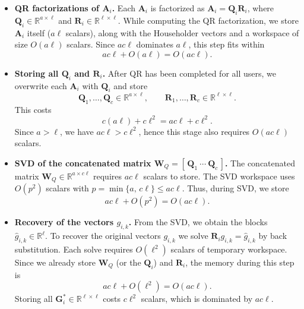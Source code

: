 \documentclass[final,3p,times]{elsarticle}
\theoremstyle{plain}
\newcommand{\matr}[1]{\bm{#1}}        %
\begin{document}
\begin{itemize}

  \item \textbf{QR factorizations of $\matr{A}_{i}$.}
        Each $\matr{A}_{i}$ is factorized as $\matr{A}_{i} = \matr{Q}_{i}\matr{R}_{i}$, where $\matr{Q}_{i}\in\mathbb{R}^{a\times \ell}$ and $\matr{R}_{i}\in\mathbb{R}^{\ell\times \ell}$. While computing the QR factorization, we store $\matr{A}_{i}$ itself ($a\ell$ scalars), along with the Householder vectors and a workspace of size $O(a\ell)$ scalars. Since $a c \ell$ dominates $a\ell$, this step fits within
        \begin{equation}
          a c \ell + O(a\ell) = O(a c \ell).
        \end{equation}

  \item \textbf{Storing all $\matr{Q}_{i}$ and $\matr{R}_{i}$.}
        After QR has been completed for all users, we overwrite each $\matr{A}_{i}$ with $\matr{Q}_{i}$ and store
        \begin{equation}
          \matr{Q}_{1},\dots,\matr{Q}_{c}\in\mathbb{R}^{a\times \ell},
          \qquad
          \matr{R}_{1},\dots,\matr{R}_{c}\in\mathbb{R}^{\ell\times \ell}.
        \end{equation}
        This costs
        \begin{equation}
          c(a\ell) + c\ell^{2} = a c \ell + c\ell^{2}.
        \end{equation}
        Since $a > \ell$, we have $a c \ell > c\ell^{2}$, hence this stage also requires $O(a c \ell)$ scalars.

  \item \textbf{SVD of the concatenated matrix $\matr{W}_{Q} = [\,\matr{Q}_{1}~\cdots~\matr{Q}_{c}\,]$.} The concatenated matrix $\matr{W}_{Q}\in\mathbb{R}^{a\times c\ell}$ requires $a c \ell$ scalars to store. The SVD workspace uses $O(p^{2})$ scalars with $p = \min\{a,\, c\ell\} \le a c \ell$. Thus, during SVD, we store
        \begin{equation}
          a c \ell + O(p^{2}) = O(a c \ell).
        \end{equation}

  \item \textbf{Recovery of the vectors $g_{i,k}$.}
        From the SVD, we obtain the blocks $\hat g_{i,k}\in\mathbb{R}^{\ell}$. To recover the original vectors $g_{i,k}$ we solve $\matr{R}_{i} g_{i,k} = \hat g_{i,k}$ by back substitution. Each solve requires $O(\ell^{2})$ scalars of temporary workspace. Since we already store $\matr{W}_{Q}$ (or the $\matr{Q}_{i}$) and $\matr{R}_{i}$, the memory during this step is
        \begin{equation}
          a c \ell + O(\ell^{2}) = O(a c \ell).
        \end{equation}
        Storing all $\matr{G}_{i}^{*} \in \mathbb{R}^{\ell\times \ell}$ costs $c\ell^{2}$ scalars, which is dominated by $a c \ell$.
\end{itemize}
\end{document}

